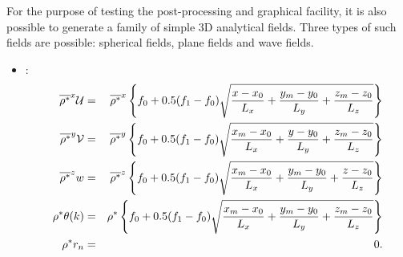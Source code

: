 For the purpose of testing the post-processing and graphical facility, it
is also possible to generate a family of simple 3D analytical fields.
Three types of such fields are possible: spherical fields, plane
fields and wave fields.
\begin{itemize}
\item {} :
\begin{eqnarray}
\overline{\rho^{*}}^{x} {\cal U} & = &  \overline{\rho^{*}}^{x}
\left\{ f_{0} + 0.5  (f_{1}- f_{0}) \sqrt{\dfrac{x-x_{0}}{L_{x}}
+ \dfrac{y_{m}-y_{0}}{L_{y}} + \dfrac{z_{m}-z_{0}}{L_{z}}}    \right\}
\\
\overline{\rho^{*}}^{y}{\cal V} & = &    \overline{\rho^{*}}^{y}
\left\{ f_{0} + 0.5  (f_{1}- f_{0}) \sqrt{\dfrac{x_{m}-x_{0}}{L_{x}}
+ \dfrac{y-y_{0}}{L_{y}} + \dfrac{z_{m}-z_{0}}{L_{z}}}    \right\}
\\
\overline{ \rho^{*}}^{z} w & = &  \overline{\rho^{*}}^{z}
\left\{ f_{0} + 0.5  (f_{1}- f_{0}) \sqrt{\dfrac{x_{m}-x_{0}}{L_{x}}
+ \dfrac{y_{m}-y_{0}}{L_{y}} + \dfrac{z-z_{0}}{L_{z}}}    \right\}
 \\
\rho^{*} \theta(k) & = &   \rho^{*} \left\{ f_{0}
+ 0.5  (f_{1}- f_{0}) \sqrt{\dfrac{x_{m}-x_{0}}{L_{x}}
+ \dfrac{y_{m}-y_{0}}{L_{y}} + \dfrac{z_{m}-z_{0}}{L_{z}}}    \right\}
\\
\rho^{*} r_{n} & = & 0.
\end{eqnarray}


\end{itemize}
